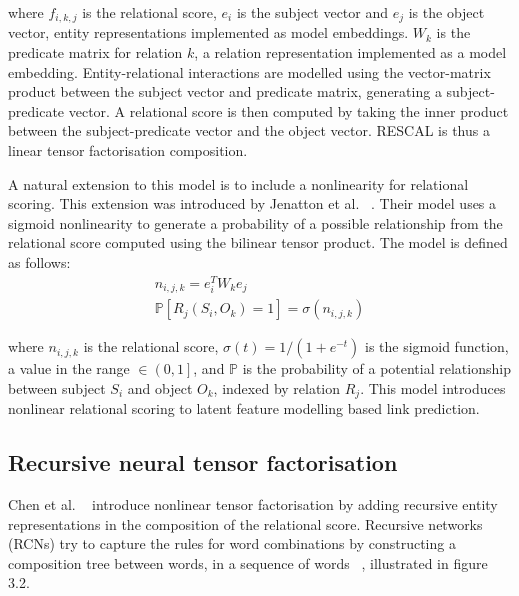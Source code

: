 \noindent where $ f_{i,k,j} $ is the relational score, $ e_i $ is the subject vector and $ e_j $ is the object vector, entity representations implemented as model embeddings. $ W_k $ is the predicate matrix for relation $ k $, a relation representation implemented as a model embedding. Entity-relational interactions are modelled using the vector-matrix product between the subject vector and predicate matrix, generating a subject-predicate vector. A relational score is then computed by taking the inner product between the subject-predicate vector and the object vector. RESCAL is thus a linear tensor factorisation composition. \par

\noindent A natural extension to this model is to include a nonlinearity for relational scoring. This extension was introduced by Jenatton et al. \unskip ~\citep{jenatton2012latent}. Their model uses a sigmoid nonlinearity to generate a probability of a possible relationship from the relational score computed using the bilinear tensor product. The model is defined as follows:
\begin{subequations}
	\begin{gather}
		n_{i,j,k} = e_i^TW_ke_j \\
		\mathbb{P}\left [ R_j(S_i, O_k) = 1 \right ] = \sigma(n_{i,j,k})
	\end{gather}
\end{subequations}

\noindent where $ n_{i,j,k} $ is the relational score, $ \sigma(t) = 1/(1 + e^{-t}) $ is the sigmoid function, a value in the range $\in \left ( 0, 1 \right ]$, and $\mathbb{P}$ is the probability of a potential relationship between subject $ S_i $ and object $ O_k $, indexed by relation $ R_j $. This model introduces nonlinear relational scoring to latent feature modelling based link prediction. 



\subsection{Recursive neural tensor factorisation}

Chen et al.  \unskip ~\citep{socher2013reasoning} introduce nonlinear tensor factorisation by adding recursive entity representations in the composition of the relational score. Recursive networks (RCNs) try to capture the rules for word combinations by constructing a composition tree between words, in a sequence of words \unskip ~\citep{socher2012semantic}, illustrated in figure 3.2. \par

